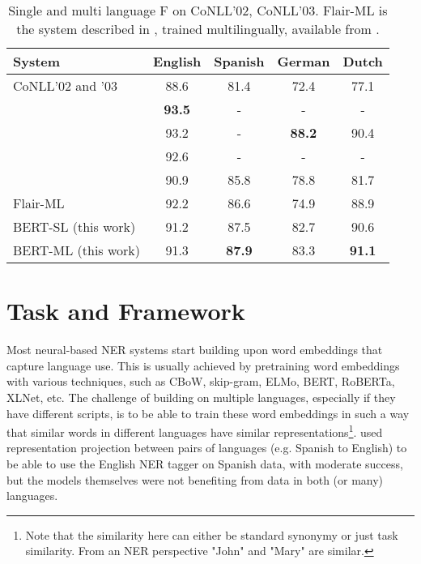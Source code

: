 \documentclass[letterpaper]{article} \usepackage{aaai20}  \usepackage{times}  \usepackage{helvet} \usepackage{courier}  \usepackage[hyphens]{url}  \usepackage{graphicx} \urlstyle{rm} \def\UrlFont{\rm}  \usepackage{graphicx}  \frenchspacing  \setlength{\pdfpagewidth}{8.5in}  \setlength{\pdfpageheight}{11in}  \usepackage{amsmath}
\newcommand{\citet}[1]{\citeauthor{#1} \shortcite{#1}}
\providecommand{\tabularnewline}{\\}
\begin{document}
\begin{table}[ht!]
\setlength\tabcolsep{2pt} \begin{tabular}{|p{4cm}|c|c|c|c|}
\hline 
{\small{}{System}} & {\small{}{English}} & {\small{}{Spanish}} & {\small{}{German}} & {\small{}{Dutch}}\tabularnewline
\hline 
{\small{}CoNLL'02 and '03} & {\small{}{88.6}} & {\small{}{81.4}} & {\small{}{72.4}} & {\small{}{77.1}}\tabularnewline
\hline 
{\small{}\citet{Baevski19-cloze5}} & {\small{}\textbf{93.5}} & {\small{}{-}} & {\small{}{-}} & {\small{}{-}}\tabularnewline
\hline 
{\small{}\citet{akbik-etal-2018-contextual}} & {\small{}{93.2}} & {\small{}{-}} & {\small{}\textbf{88.2}} & {\small{}{90.4}}\tabularnewline
\hline 
{\small{}\citet{BERT18}} & {\small{}{92.6}} & {\small{}{-}} & {\small{}{-}} & {\small{}{-}}\tabularnewline
\hline 
{\small{}\citet{LampleBSKD16}} & {\small{}{90.9}} & {\small{}{85.8}} & {\small{}{78.8}} & {\small{}{81.7}}\tabularnewline
\hline 
{\small{}Flair-ML} & {\small{}{92.2}} & {\small{}{86.6}} & {\small{}{74.9}} & {\small{}{88.9}}\tabularnewline
\hline \hline
{\small{}{BERT-SL (this work)}} & {\small{}{91.2}} & {\small{}87.5} & {\small{}82.7} & {\small{}{90.6}}\tabularnewline
\hline 
{\small{}{BERT-ML (this work)}} & {\small{}{91.3}} & {\small{}\textbf{87.9}} & {\small{}{83.3}} & {\small{}\textbf{91.1}} \tabularnewline
\hline 
\end{tabular}{\small{}{\small{}\vspace*{2mm}}}


{\small{}\caption{Single and multi language F on CoNLL'02, CoNLL'03. Flair-ML is the system described in \cite{akbik-etal-2018-contextual}, trained multilingually, available from \cite{akbik19:flair}\label{table:Multitrain}.}
}{\small\par}
\end{table}
 \section{Task and Framework}
Most neural-based NER systems start building upon word embeddings that capture language use. This is usually
achieved by pretraining word embeddings with various techniques, such as
CBoW, skip-gram, ELMo, BERT, RoBERTa, XLNet, etc. The challenge of building on multiple languages, especially if they have different scripts, is to be able to
train these word embeddings in such a way that similar words in different
languages have similar representations\footnote{Note that the
  similarity here can either be standard synonymy or just task
  similarity. From an NER perspective "John" and "Mary" are
  similar.}. \citet{ni-etal-2017-weakly} used representation projection
between pairs of languages (e.g. Spanish to English) to be able to use
the English NER tagger on Spanish data, with moderate success, but the
models themselves were not benefiting from data in both (or many)
languages.
\end{document}

